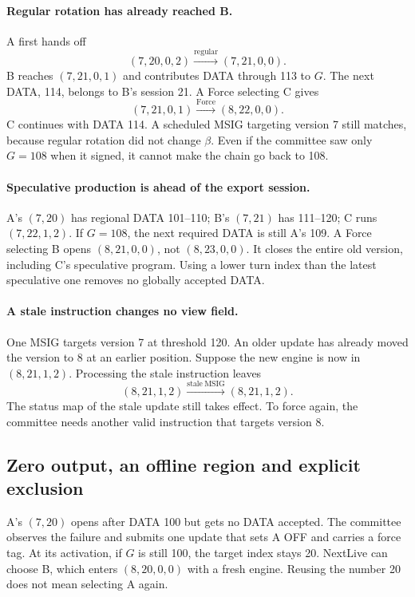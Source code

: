 \documentclass[11pt,a4paper]{article}
\begin{document}
\paragraph{Regular rotation has already reached B.}
A first hands off
\[
 (7,20,0,2)\xrightarrow{\mathrm{regular}}(7,21,0,0).
\]
B reaches $(7,21,0,1)$ and contributes DATA through 113 to $G$. The next
DATA, 114, belongs to B's session 21. A Force selecting C gives
\[
 (7,21,0,1)\xrightarrow{\mathrm{Force}}(8,22,0,0).
\]
C continues with DATA 114. A scheduled MSIG targeting version 7 still
matches, because regular rotation did not change $\beta$. Even if the
committee saw only $G=108$ when it signed, it cannot make the chain go
back to 108.

\paragraph{Speculative production is ahead of the export session.}
A's $(7,20)$ has regional DATA 101--110; B's $(7,21)$ has 111--120; C runs
$(7,22,1,2)$. If $G=108$, the next required DATA is still A's 109. A Force
selecting B opens $(8,21,0,0)$, not $(8,23,0,0)$. It closes the entire old
version, including C's speculative program. Using a lower turn index than
the latest speculative one removes no globally accepted DATA.

\paragraph{A stale instruction changes no view field.}
One MSIG targets version 7 at threshold 120. An older update has already
moved the version to 8 at an earlier position. Suppose the new
engine is now in $(8,21,1,2)$. Processing the stale instruction leaves
\[
 (8,21,1,2)\xrightarrow{\mathrm{stale\ MSIG}}(8,21,1,2).
\]
The status map of the stale update still takes effect. To force
again, the committee needs another valid instruction that targets
version 8.

\subsection{Zero output, an offline region and explicit exclusion}
\label{sec:retry-example}
A's $(7,20)$ opens after DATA 100 but gets no DATA accepted. The committee
observes the failure and submits one update that sets A OFF and carries
a force tag. At its activation, if
$G$ is still 100, the target index stays 20. NextLive can choose B, which
enters $(8,20,0,0)$ with a fresh engine. Reusing the number 20 does not
mean selecting A again.
\end{document}

